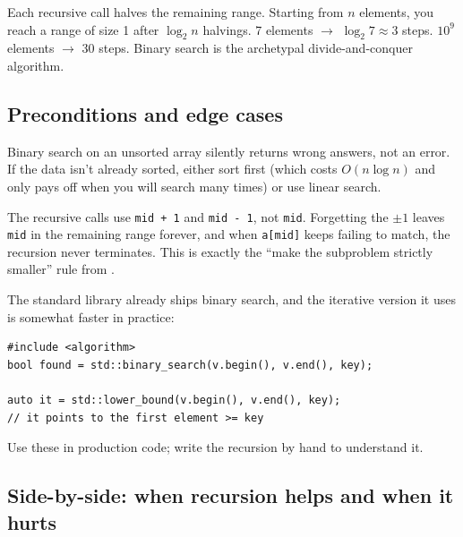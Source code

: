 \documentclass[11pt]{article}
\begin{document}
\begin{notebox}
Each recursive call halves the remaining range. Starting from $n$
elements, you reach a range of size 1 after $\log_2 n$ halvings. 7
elements $\to$ $\log_2 7 \approx 3$ steps. $10^9$ elements $\to$ 30
steps. Binary search is the archetypal divide-and-conquer algorithm.
\end{notebox}

\subsection{Preconditions and edge cases}

\begin{warnbox}
Binary search on an unsorted array silently returns wrong answers,
not an error. If the data isn't already sorted, either sort first
(which costs $O(n \log n)$ and only pays off when you will search
many times) or use linear search.
\end{warnbox}

\begin{warnbox}
The recursive calls use \texttt{mid + 1} and \texttt{mid - 1}, not
\texttt{mid}. Forgetting the $\pm 1$ leaves \texttt{mid} in the
remaining range forever, and when \texttt{a[mid]} keeps failing to
match, the recursion never terminates. This is exactly the ``make
the subproblem strictly smaller'' rule from .
\end{warnbox}

\begin{notebox}
The standard library already ships binary search, and the iterative
version it uses is somewhat faster in practice:
\begin{verbatim}
#include <algorithm>
bool found = std::binary_search(v.begin(), v.end(), key);

auto it = std::lower_bound(v.begin(), v.end(), key);
// it points to the first element >= key
\end{verbatim}
Use these in production code; write the recursion by hand to
understand it.
\end{notebox}

\subsection{Side-by-side: when recursion helps and when it hurts}
\end{document}
